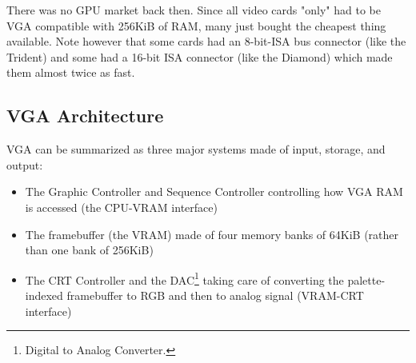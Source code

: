 \documentclass[book.tex]{subfiles}
\begin{document}
\begin{figure}[H] 
  \centering 
  
\end{figure}
\par
\begin{figure}[H] 
  \centering 
\end{figure}
\pagebreak





 There was no GPU market back then. Since all video cards "only" had to be VGA compatible with 256KiB of RAM, many just bought the cheapest thing available. Note however that some cards had an 8-bit-ISA bus connector (like the Trident) and some had a 16-bit ISA connector (like the Diamond) which made them almost twice as fast.\\
\par




\subsection{VGA Architecture}

VGA can be summarized as three major systems made of input, storage, and output:
\begin{itemize}
\item The Graphic Controller and Sequence Controller controlling how VGA RAM is accessed (the CPU-VRAM interface)
\item The framebuffer (the VRAM) made of four memory banks of 64KiB (rather than one bank of 256KiB)
\item The CRT Controller and the DAC\footnote{Digital to Analog Converter.} taking care of converting the palette-indexed framebuffer to RGB and then to analog signal (VRAM-CRT interface)
\end{itemize}
\end{document}
